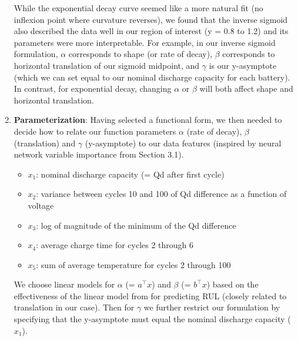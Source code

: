 \documentclass{article}
\begin{document}
\begin{enumerate}[label=(\alph*), leftmargin=.35in]
    While the exponential decay curve seemed like a more natural fit (no inflexion point where curvature reverses), we found that the inverse sigmoid also described the data well in our region of interest (y = 0.8 to 1.2) and its parameters were more interpretable. For example, in our inverse sigmoid formulation, $\alpha$ corresponds to shape (or rate of decay), $\beta$ corresponds to horizontal translation of our sigmoid midpoint, and $\gamma$ is our y-asymptote (which we can set equal to our nominal discharge capacity for each battery). In contrast, for exponential decay, changing $\alpha$ or $\beta$ will both affect shape and horizontal translation. 
\newline
    \item \textbf{Parameterization}: Having selected a functional form, we then needed to decide how to relate our function parameters $\alpha$ (rate of decay), $\beta$ (translation) and $\gamma$ (y-asymptote) to our data features (inspired by neural network variable importance from Section 3.1). 

    \begin{itemize}
        \item \textbf{$x_1$}: nominal discharge capacity (= Qd after first cycle)
        \item \textbf{$x_2$}: variance between cycles 10 and 100 of Qd difference as a function of voltage 
        \item \textbf{$x_3$}: log of magnitude of the minimum of the Qd difference
        \item \textbf{$x_4$}: average charge time for cycles 2 through 6
        \item \textbf{$x_5$}: sum of average temperature for cycles 2 through 100
    \end{itemize}

    We choose linear models for $\alpha$ (= $a^\top x$) and $\beta$ (= $b^\top x$) based on the effectiveness of the linear model from \cite{severson2019data} for predicting RUL (closely related to translation in our case). Then for $\gamma$ we further restrict our formulation by specifying that the y-asymptote must equal the nominal discharge capacity ($x_1$).



\end{enumerate}
\end{document}
